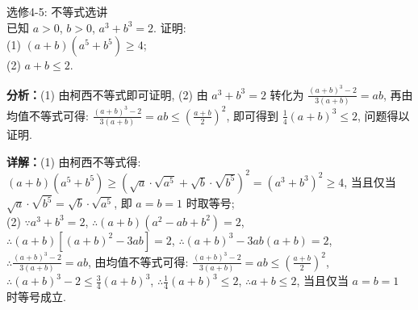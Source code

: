 \begin{question}[points=10]
选修4-5: 不等式选讲 \\ 已知 $a>0$, $b>0$, $a^3+b^3=2$. 证明: \\ (1) $(a+b)(a^5+b^5)\ge4$; \\ (2) $a+b\le2$.
\begin{solution}

\textbf{分析：}(1) 由柯西不等式即可证明, (2) 由 $a^3+b^3=2$ 转化为 $\frac{(a+b)^3-2}{3(a+b)}=ab$, 再由均值不等式可得: $\frac{(a+b)^3-2}{3(a+b)}=ab\le\left(\frac{a+b}{2}\right)^2$, 即可得到 $\frac{1}{4}(a+b)^3\le2$, 问题得以证明.

\textbf{详解：}(1) 由柯西不等式得: $(a+b)(a^5+b^5)\ge(\sqrt{a}\cdot\sqrt{a^5}+\sqrt{b}\cdot\sqrt{b^5})^2=(a^3+b^3)^2\ge4$, 当且仅当 $\sqrt{a}\cdot\sqrt{b^5}=\sqrt{b}\cdot\sqrt{a^5}$, 即 $a=b=1$ 时取等号; \\ (2) $\because a^3+b^3=2$, $\therefore (a+b)(a^2-ab+b^2)=2$, $\therefore (a+b)[(a+b)^2-3ab]=2$, $\therefore (a+b)^3-3ab(a+b)=2$, $\therefore \frac{(a+b)^3-2}{3(a+b)}=ab$, 由均值不等式可得: $\frac{(a+b)^3-2}{3(a+b)}=ab\le\left(\frac{a+b}{2}\right)^2$, $\therefore (a+b)^3-2\le\frac{3}{4}(a+b)^3$, $\therefore \frac{1}{4}(a+b)^3\le2$, $\therefore a+b\le2$, 当且仅当 $a=b=1$ 时等号成立.
\end{solution}
\end{question}

